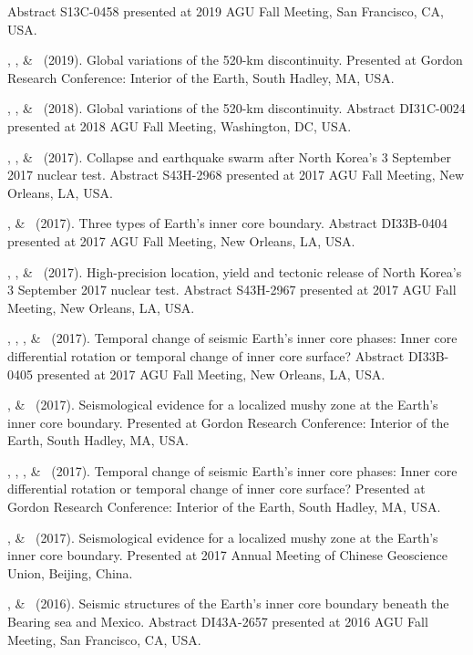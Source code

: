 \begin{etaremune}
    Abstract S13C-0458 presented at 2019 AGU Fall Meeting, San Francisco, CA, USA.
\item
    \Me, \SWei, \& \PShearer\ (2019).
    Global variations of the 520-km discontinuity.
    Presented at Gordon Research Conference: Interior of the Earth, South Hadley, MA, USA.
\item
    \Me, \SWei, \& \PShearer\ (2018).
    Global variations of the 520-km discontinuity.
    Abstract DI31C-0024 presented at 2018 AGU Fall Meeting, Washington, DC, USA.
\item
    \Me, \JYao, \& \LWen\ (2017).
    Collapse and earthquake swarm after North Korea's 3 September 2017 nuclear test.
    Abstract S43H-2968 presented at 2017 AGU Fall Meeting, New Orleans, LA, USA.
\item
    \Me, \& \LWen\ (2017).
    Three types of Earth's inner core boundary.
    Abstract DI33B-0404 presented at 2017 AGU Fall Meeting, New Orleans, LA, USA.
\item
    \JYao, \Me, \& \LWen\ (2017).
    High-precision location, yield and tectonic release of North Korea's 3 September 2017 nuclear test.
    Abstract S43H-2967 presented at 2017 AGU Fall Meeting, New Orleans, LA, USA.
\item
    \JYao, \Me, \LSun, \& \LWen\ (2017).
    Temporal change of seismic Earth's inner core phases: Inner core differential rotation or temporal change of inner core surface?
    Abstract DI33B-0405 presented at 2017 AGU Fall Meeting, New Orleans, LA, USA.
\item
    \Me, \& \LWen\ (2017).
    Seismological evidence for a localized mushy zone at the Earth's inner core boundary.
    Presented at Gordon Research Conference: Interior of the Earth, South Hadley, MA, USA.
\item
    \JYao, \Me, \LSun, \& \LWen\ (2017).
    Temporal change of seismic Earth's inner core phases: Inner core differential rotation or temporal change of inner core surface?
    Presented at Gordon Research Conference: Interior of the Earth, South Hadley, MA, USA.
\item
    \Me, \& \LWen\ (2017).
    Seismological evidence for a localized mushy zone at the Earth's inner core boundary.
    Presented at 2017 Annual Meeting of Chinese Geoscience Union, Beijing, China.
\item
    \Me, \& \LWen\ (2016).
    Seismic structures of the Earth's inner core boundary beneath the Bearing sea and Mexico.
    Abstract DI43A-2657 presented at 2016 AGU Fall Meeting, San Francisco, CA, USA.

\end{etaremune}
